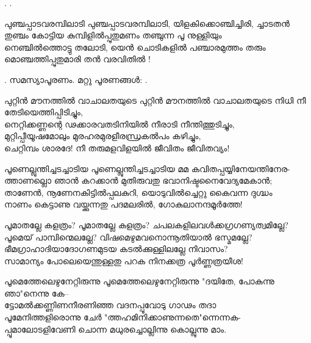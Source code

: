 \begin{enumerate}


.
.


\begin{slokam}{\VSv}{\RV}{പുഞ്ചപ്പാടവരമ്പിലാടി}
പുഞ്ചപ്പാടവരമ്പിലാടി, യിളകിക്കൊഞ്ചിച്ചിരി, ച്ചാടതൻ\\
തുഞ്ചം കോട്ടിയ കുമ്പിളിൽപ്പുതുമണം തഞ്ചുന്ന പൂ നുള്ളിയും\\
നെഞ്ചിൽത്തൊട്ടു തലോടി, യെൻ ചൊടികളിൽ പഞ്ചാരമുത്തം തരും\\
മൊഞ്ചത്തിപ്പുതുമാരി തൻ വരവിതിൽ !
\end{slokam}


.
സമസ്യാപൂരണം. മറ്റു പൂരണങ്ങൾ: .


\begin{slokam}{\VSr}{\YK}{പുറ്റിൻ മൗനത്തിൽ വാചാലതയുടെ}
പുറ്റിൻ മൗനത്തിൽ വാചാലതയുടെ നിധി നീ തേടിയെത്തിപ്പിടിച്ചും,\\
നെറ്റിക്കണ്ണന്റെ ഢക്കാരവതടിനിയിൽ നീരാടി നീന്തിത്തുടിച്ചും,\\
മുറ്റിപ്പീയൂഷമോലും മുരഹരമുരളീരന്ധ്രകൽപം കഴിച്ചും,\\
ചെറ്റിമ്പം ശാരദേ! നീ തരുമളവിളയിൽ ജീവിതം ജീവിതവ്യം!
\end{slokam}



\begin{slokam}{\VSr}{\VKG}{പൂണെല്ലുന്തിച്ചടച്ചാടിയ}
പൂണെല്ലുന്തിച്ചടച്ചാടിയ മമ കവിതപ്പയ്യിനേയന്തിനേര-\\
ത്താണല്ലൊ ഞാൻ കറക്കാൻ മുതിരുവതു ഭവാനിഷ്ടനൈവേദ്യമേകാൻ;\\
താണേൻ, നൂണേനകിട്ടിൽപ്പലകുറി, യൊടുവിൽച്ചെറ്റു കൈവന്ന ദുഗ്ദ്ധം\\
നാണം കെട്ടാണു വയ്ക്കുന്നതു പദമലരിൽ, ഗോകുലാനന്ദമൂർത്തേ!
\end{slokam}



\begin{slokam}{\VSr}{\ONN}{പൂമാതല്ലേ കളത്രം?}
പൂമാതല്ലേ കളത്രം? ചപലകളിലവള്‍ക്കഗ്രഗണ്യത്വമില്ലേ?\\
പൂമെയ്‌ പാമ്പിന്മെലല്ലേ? വിഷമെഴുമവനൊന്നൂതിയാൽ ഭസ്മമല്ലേ?\\
ഭീമഗ്രാഹാദിയാദോഗണമുടയ കടൽക്കുള്ളിലല്ലേ നിവാസം?\\
സാമാന്യം പോലെയെന്തുള്ളതു പറക നിനക്കത്ര പൂർണ്ണത്രയീശ!
\end{slokam}


\begin{slokam}{\VSv}{\Poonth}{പൂമെത്തേലെഴുനേറ്റിരുന്നു}
പൂമെത്തേലെഴുനേറ്റിരുന്നു "ദയിതേ, പോകുന്നു ഞാ"നെന്നു കേ--\\
ട്ടോമൽക്കണ്ണിണനീരണിഞ്ഞ വദനപ്പൂവോടു ഗാഢം തദാ\\
പൂമേനിത്തളിരൊന്നു ചേർ "ത്തഹമിനിക്കാണുന്നതെ"ന്നെന്നക-\\
പ്പൂമാലോടളിവേണി ചൊന്ന മധുരച്ചൊല്ലിന്നു കൊല്ലുന്നു മാം.
\end{slokam}


\end{enumerate}
